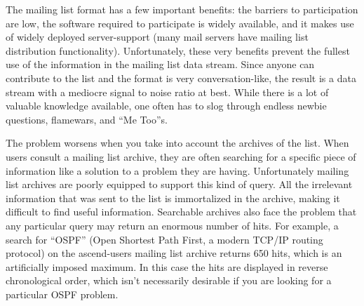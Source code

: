 The mailing list format has a few important benefits: the barriers to
participation are low, the software required to participate is widely
available, and it makes use of widely deployed server-support (many mail
servers have mailing list distribution functionality). Unfortunately, these
very benefits prevent the fullest use of the information in the mailing list
data stream.  Since anyone can contribute to the list and the format is very
conversation-like, the result is a data stream with a mediocre signal to noise
ratio at best. While there is a lot of valuable knowledge available, one often
has to slog through endless newbie questions, flamewars, and ``Me Too''s.

The problem worsens when you take into account the archives of the list. When
users consult a mailing list archive, they are often searching for a specific
piece of information like a solution to a problem they are having.
Unfortunately mailing list archives are poorly equipped to support this kind of
query. All the irrelevant information that was sent to the list is immortalized
in the archive, making it difficult to find useful information. Searchable
archives also face the problem that any particular query may return an enormous
number of hits. For example, a search for ``OSPF'' (Open Shortest Path First, a
modern TCP/IP routing protocol) on the ascend-users mailing list archive
\cite{nexial-ascend-website} returns 650 hits, which is an artificially imposed
maximum. In this case the hits are displayed in reverse chronological order,
which isn't necessarily desirable if you are looking for a particular OSPF
problem.

